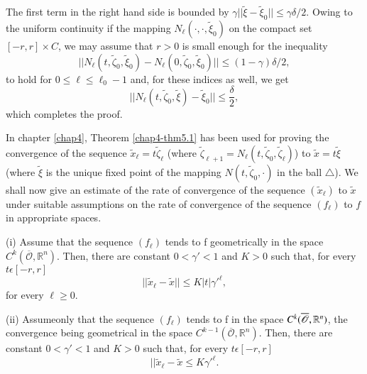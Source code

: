 The first term in the right hand side is bounded by $\gamma ||
\widetilde{\xi} -  \widetilde{\xi}_{0}|| \leq \gamma \delta /
2$. Owing to the uniform continuity if the mapping $N_{\ell} (\cdot,
\cdot,  \widetilde{\xi}_{0})$ on the compact set $[-r, r] \times C$,
we may assume that $r > 0$ is small enough for the inequality
$$
||N_{\ell} (t,  \widetilde{\zeta}_{0},  \widetilde{\xi}_{0}) -
N_{\ell} (0,  \widetilde{\zeta}_{0},  \widetilde{\xi}_{0})|| \leq (1 -
\gamma) \delta / 2,
$$
to hold for $0 \leq \ell \leq \ell_{0} - 1$ and, for these indices as
well, we get
$$
||N_{\ell} (t,  \widetilde{\zeta}_{0},  \widetilde{\xi}) -
\widetilde{\xi}_{0}|| \leq \frac{\delta}{2},
$$
which completes the proof.

In chapter \ref{chap4}, Theorem \ref{chap4-thm5.1} has been used for
proving the convergence of the sequence $ \widetilde{x}_{\ell} = t
\widetilde{\zeta}_{\ell}$ (where $ \widetilde{\zeta}_{\ell + 1} =
N_{\ell}(t,  \widetilde{\zeta}_{0},  \widetilde{\zeta}_{\ell})$) to $
\widetilde{x} = t \widetilde{\xi}$ (where $ \widetilde{\xi}$ is the
unique fixed point of the mapping $N(t,  \widetilde{\zeta}_{0},
\cdot)$ in the ball $\triangle$). We shall now give an estimate of the
rate of convergence of the sequence $( \widetilde{x}_{\ell})$ to $
\widetilde{x}$ under suitable assumptions on the rate of convergence
of the sequence $(f_{\ell})$ to $f$ in appropriate spaces.

\begin{alphtheorem}\label{app-2-thmA2.1}%
(i) Assume that the sequence $(f_{\ell})$ tends to f geometrically in
  the space $C^{k}(\overline{\mathscr{O}}, \mathbb{R}^{n})$. Then,
  there are constant $0 < \gamma' < 1$ and $K > 0$ such that, for
  every $t \epsilon [-r, r]$
\begin{equation*}
|| \widetilde{x}_{\ell} -  \widetilde{x}|| \leq K|t| \gamma'^{\ell},\tag{A2.21}\label{app-2-eqA2.21}
\end{equation*}
for every $\ell \geq 0$.

(ii) Assume\pageoriginale only that the sequence $(f_{\ell})$ tends to
f in the space $C^{k} (\overline{\mathscr{O}},\break \mathbb{R}^{n})$, the
convergence being geometrical in the space $C^{k-1}
(\overline{\mathscr{O}}, \mathbb{R}^{n})$. Then, there are constant $0
< \gamma' < 1$ and $K > 0$ such that, for every $t \epsilon [-r, r]$
\begin{equation*}
|| \widetilde{x}_{\ell} -  \widetilde{x} \leq K\gamma'^{\ell}.\tag{A2.22}\label{app-2-eqA2.22}
\end{equation*}
\end{alphtheorem}


